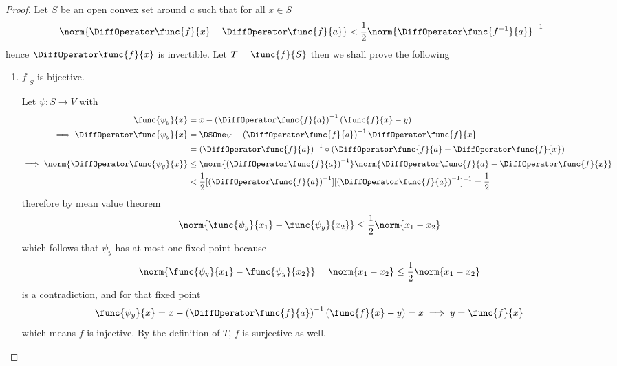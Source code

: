 \begin{proof}
    Let \(S\) be an open convex set around \(a\) such that for all \(x \in S\)
    \begin{equation*}
        \norm{\DiffOperator \func{f}{x} - \DiffOperator \func{f}{a}} < \dfrac{1}{2} \norm{\DiffOperator \func{f^{-1}}{a}}^{-1}
    \end{equation*}
    hence \(\DiffOperator \func{f}{x}\) is invertible. Let \(T = \func{f}{S}\) then we shall prove the following
    \begin{enumerate}
        \item \(f|_S\) is bijective.

              Let \(\psi : S \to V\) with
              \begin{align*}
                  \func{\psi_y}{x}                                & = x - \left(\DiffOperator \func{f}{a}\right)^{-1} (\func{f}{x} - y)                                                            \\
                  \implies \DiffOperator \func{\psi_y}{x }        & = \DSOne_V - \left(\DiffOperator \func{f}{a}\right)^{-1} \DiffOperator \func{f}{x}                                             \\
                                                                  & = \left(\DiffOperator \func{f}{a}\right)^{-1} \circ \left( \DiffOperator \func{f}{a} - \DiffOperator \func{f}{x} \right)       \\
                  \implies \norm{\DiffOperator \func{\psi_y}{x }} & \leq \norm{\left(\DiffOperator \func{f}{a}\right)^{-1}} \norm{\DiffOperator \func{f}{a} - \DiffOperator \func{f}{x}}           \\
                                                                  & < \dfrac{1}{2} [\left(\DiffOperator \func{f}{a}\right)^{-1}] [\left(\DiffOperator \func{f}{a}\right)^{-1}]^{-1} = \dfrac{1}{2}
              \end{align*}
              therefore by mean value theorem
              \begin{equation*}
                  \norm{\func{\psi_y}{x_1} - \func{\psi_y}{x_2}} \leq \dfrac{1}{2} \norm{x_1 - x_2}
              \end{equation*}
              which follows that \(\psi_y\) has at most one fixed point because
              \begin{equation*}
                  \norm{\func{\psi_y}{x_1} - \func{\psi_y}{x_2}} = \norm{x_1 - x_2} \leq  \dfrac{1}{2} \norm{x_1 - x_2}
              \end{equation*}
              is a contradiction, and for that fixed point
              \begin{equation*}
                  \func{\psi_y}{x} = x - \left(\DiffOperator \func{f}{a}\right)^{-1} (\func{f}{x} - y) = x \implies y = \func{f}{x}
              \end{equation*}
              which means \(f\) is injective. By the definition of \(T\), \(f\) is surjective as well.


\end{enumerate}
\end{proof}
